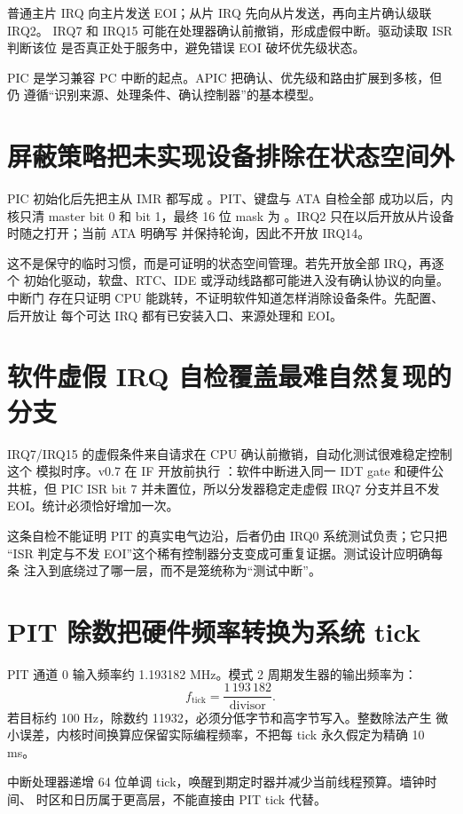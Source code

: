 普通主片 IRQ 向主片发送 EOI；从片 IRQ 先向从片发送，再向主片确认级联 IRQ2。
IRQ7 和 IRQ15 可能在处理器确认前撤销，形成虚假中断。驱动读取 ISR 判断该位
是否真正处于服务中，避免错误 EOI 破坏优先级状态。

PIC 是学习兼容 PC 中断的起点。APIC 把确认、优先级和路由扩展到多核，但仍
遵循“识别来源、处理条件、确认控制器”的基本模型。

\section{屏蔽策略把未实现设备排除在状态空间外}

PIC 初始化后先把主从 IMR 都写成 。PIT、键盘与 ATA 自检全部
成功以后，内核只清 master bit 0 和 bit 1，最终 16 位 mask 为
。IRQ2 只在以后开放从片设备时随之打开；当前 ATA 明确写
 并保持轮询，因此不开放 IRQ14。

这不是保守的临时习惯，而是可证明的状态空间管理。若先开放全部 IRQ，再逐个
初始化驱动，软盘、RTC、IDE 或浮动线路都可能进入没有确认协议的向量。中断门
存在只证明 CPU 能跳转，不证明软件知道怎样消除设备条件。先配置、后开放让
每个可达 IRQ 都有已安装入口、来源处理和 EOI。

\section{软件虚假 IRQ 自检覆盖最难自然复现的分支}

IRQ7/IRQ15 的虚假条件来自请求在 CPU 确认前撤销，自动化测试很难稳定控制这个
模拟时序。v0.7 在 IF 开放前执行 ：软件中断进入同一 IDT
gate 和硬件公共桩，但 PIC ISR bit 7 并未置位，所以分发器稳定走虚假 IRQ7
分支并且不发 EOI。统计必须恰好增加一次。

这条自检不能证明 PIT 的真实电气边沿，后者仍由 IRQ0 系统测试负责；它只把
“ISR 判定与不发 EOI”这个稀有控制器分支变成可重复证据。测试设计应明确每条
注入到底绕过了哪一层，而不是笼统称为“测试中断”。

\section{PIT 除数把硬件频率转换为系统 tick}

PIT 通道 0 输入频率约 1.193182 MHz。模式 2 周期发生器的输出频率为：
\[
  f_{\mathrm{tick}}=\frac{1\,193\,182}{\mathrm{divisor}}.
\]
若目标约 100 Hz，除数约 11932，必须分低字节和高字节写入。整数除法产生
微小误差，内核时间换算应保留实际编程频率，不把每 tick 永久假定为精确
10 ms。

中断处理器递增 64 位单调 tick，唤醒到期定时器并减少当前线程预算。墙钟时间、
时区和日历属于更高层，不能直接由 PIT tick 代替。

